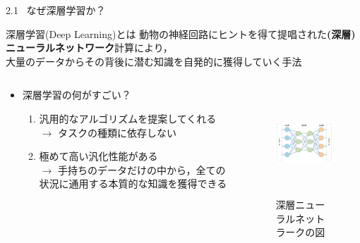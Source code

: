 \documentclass[dvipdfmx,8pt]{beamer}
\begin{document}
  \begin{frame}{2.1 \ なぜ深層学習か？}
    \begin{block}{深層学習(Deep Learning)とは}
      動物の神経回路にヒントを得て提唱された\textbf{(深層)ニューラルネットワーク}計算により，\\
      大量のデータからその背後に潜む知識を自発的に獲得していく手法
    \end{block}
    \begin{columns}
      \begin{column}{0.5\textwidth}
        \begin{itemize}
          \item 深層学習の何がすごい？
          \vspace{0.3cm}
          \begin{enumerate}
            \item 汎用的なアルゴリズムを提案してくれる\\
            $\rightarrow$ タスクの種類に依存しない
            \vspace{0.3cm}
            \item 極めて高い汎化性能がある\\
            $\rightarrow$ 手持ちのデータだけの中から，全ての状況に通用する本質的な知識を獲得できる
          \end{enumerate}
        \end{itemize}
      \end{column}
      \begin{column}{0.5\textwidth}
        \begin{figure}
          \begin{center}
            \includegraphics[height=4cm]{./NN.png}
          \end{center} 
          \caption{深層ニューラルネットラークの図}  
        \end{figure}
      \end{column}
    \end{columns}
    
  \end{frame}
\end{document}
